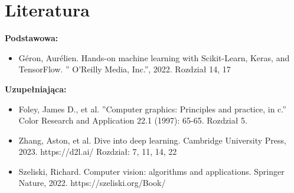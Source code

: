 \documentclass[12pt, a4paper]{article}
\begin{document}
\section{Literatura}

\textbf{Podstawowa:}
\begin{itemize}
  \item Géron, Aurélien. Hands-on machine learning with Scikit-Learn, Keras, and TensorFlow. '' O'Reilly Media, Inc.'', 2022.  Rozdział 14, 17
\end{itemize}

\textbf{Uzupełniająca:}
\begin{itemize}
  \item Foley, James D., et al. ''Computer graphics: Principles and practice, in c.'' Color Research and Application 22.1 (1997): 65-65. Rozdział 5.
  \item Zhang, Aston, et al. Dive into deep learning. Cambridge University Press, 2023. https://d2l.ai/ Rozdział: 7, 11, 14, 22
  \item Szeliski, Richard. Computer vision: algorithms and applications. Springer Nature, 2022. https://szeliski.org/Book/
\end{itemize}
\end{document}
